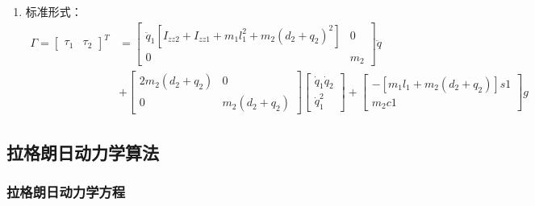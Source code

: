 \documentclass[
12pt, %
a4paper, 
oneside, %
headinclude,footinclude, %
]{scrartcl}
\begin{document}
{\begin{enumerate}
\begin{align*}
\tau_1 &= ^1n_1 \cdot ^1Z_1 = \ddot{q}_1[I_{zz2} + I_{zz1} + m_1l_1^2 + m_2(d_2 + q_2)^2] + 2m_2\dot{q}_1\dot{q}_2(d_2 + q_2) - [m_1l_1 + m_2(d_2 + q_2)]gs1
\end{align*}
\item 标准形式：
\begin{align*}
\Gamma = \begin{bmatrix} \tau_1 & \tau_2 \end{bmatrix}^T &= \begin{bmatrix} \ddot{q}_1[I_{zz2} + I_{zz1} + m_1l_1^2 + m_2(d_2 + q_2)^2] & 0 \\ 0 & m_2 \end{bmatrix} \ddot{q} \\
&+ \begin{bmatrix} 2m_2(d_2 + q_2) & 0 \\ 0 & m_2(d_2 + q_2) \end{bmatrix} \begin{bmatrix} \dot{q}_1\dot{q}_2 \\ \dot{q}_1^2 \end{bmatrix} + \begin{bmatrix} - [m_1l_1 + m_2(d_2 + q_2)]s1 \\ m_2c1 \end{bmatrix} g 
\end{align*}
\end{enumerate}
}
\subsection{拉格朗日动力学算法}
\subsubsection{拉格朗日动力学方程}
\end{document}
